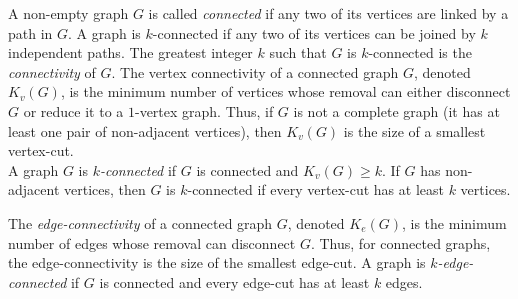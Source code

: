 \documentclass[12pt]{report}
\begin{document}
 A non-empty graph $G$ is called {\em connected} if any two of its vertices are linked by a path in $G$.
A graph is $k$-connected if any two of its vertices can be joined by
$k$ independent paths. The greatest integer $k$ such that $G$ is
$k$-connected is the {\em connectivity} of $G$. The vertex
connectivity of a connected graph $G$, denoted $K_v(G)$, is the
minimum number of vertices whose removal can either disconnect $G$
or reduce it to a $1$-vertex graph.
Thus, if $G$ is not a complete graph (it has at least one pair of non-adjacent vertices), then $K_v(G)$ is the size of a smallest vertex-cut.\\
A graph $G$ is {\em $k$-connected} if $G$ is connected and
$K_v(G)\geq k$. If $G$ has non-adjacent vertices, then $G$ is
$k$-connected if every vertex-cut has at least $k$ vertices.

The {\em edge-connectivity} of a connected graph $G$, denoted
$K_e(G)$, is the minimum number of edges whose removal can
disconnect $G$. Thus, for connected graphs, the edge-connectivity is
the size of the smallest edge-cut. A graph is {\em
$k$-edge-connected} if $G$ is connected and every edge-cut has at
least $k$ edges.
\end{document}
